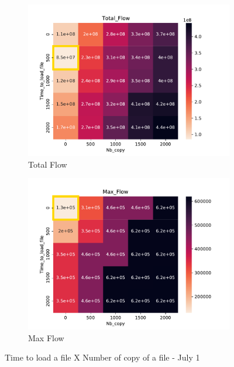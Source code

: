\documentclass[a4paper]{article}
\begin{document}
\begin{figure}[H]
\begin{subfigure}[b]{0.4\linewidth}\centering\includegraphics[width=1\linewidth]{MBSS/plot/Heatmap_Total_Flow_FCFS_Score_Time_to_load_file_Nb_copy_2022-01-24->2022-01-24_450_128_32_256_4_1024.pdf}\caption{Total Flow}\end{subfigure}
\begin{subfigure}[b]{0.4\linewidth}\centering\includegraphics[width=1\linewidth]{MBSS/plot/Heatmap_Max_Flow_FCFS_Score_Time_to_load_file_Nb_copy_2022-01-24->2022-01-24_450_128_32_256_4_1024.pdf}\caption{Max Flow}\end{subfigure}
\caption{Time to load a file X Number of copy of a file - July 1}\end{figure}
\end{document}
